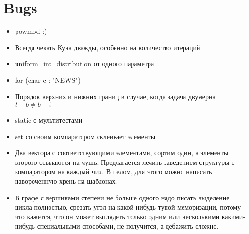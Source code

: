 \section{Bugs}

\begin{itemize}
    \item powmod :)

    \item Всегда чекать Куна дважды, особенно на количество итераций
    
    \item uniform\_int\_distribution от одного параметра
    
    \item for (char c : "NEWS")
    
    \item Порядок верхних и нижних границ в случае, когда задача двумерна
    $t - b \neq b - t$
    
    \item static с мультитестами

    \item set со своим компаратором склеивает элементы

    \item Два вектора с соответствующими элементами, сортим один, а элементы
    второго ссылаются на чушь. Предлагается лечить заведением структуры с
    компаратором на каждый чих. В целом, для этого можно написать навороченную
    хрень на шаблонах.

    \item В графе с вершинами степени не больше одного надо писать выделение
    цикла полностью, срезать угол на какой-нибудь тупой меморизации, потому
    что кажется, что он может выглядеть только одним или несколькими
    какими-нибудь специальными способами, не получится, а дебажить сложно.
\end{itemize}
